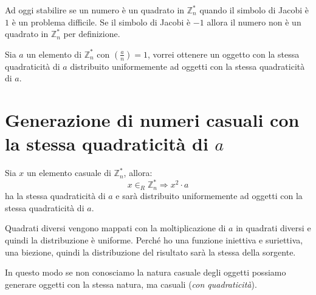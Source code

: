 Ad oggi stabilire se un numero è un quadrato in $\mathbb{Z}_n^*$
quando il simbolo di Jacobi è $1$ è un problema difficile.
Se il simbolo di Jacobi è $-1$ allora il numero non è un quadrato
in $\mathbb{Z}_n^*$ per definizione.

Sia $a$ un elemento di $\mathbb{Z}_n^*$ con $\left(\frac{a}{n} \right) = 1$, 
vorrei ottenere un oggetto con la stessa quadraticità di $a$ 
distribuito uniformemente ad oggetti con la stessa quadraticità di $a$.
\section{Generazione di numeri casuali con la stessa quadraticità di $a$}
Sia $x$ un elemento casuale di $\mathbb{Z}_n^*$, allora:
\[
  x \in_R \mathbb{Z}_n^* \Rightarrow x^2 \cdot a
\]
ha la stessa quadraticità di $a$ e sarà distribuito uniformemente 
ad oggetti con la stessa quadraticità di $a$.

Quadrati diversi vengono mappati con la moltiplicazione di $a$ in quadrati 
diversi e quindi la distribuzione è uniforme.
Perché ho una funzione iniettiva e suriettiva, una biezione, quindi la distribuzione 
del risultato sarà la stessa della sorgente.

In questo modo se non conosciamo la natura casuale degli oggetti possiamo 
generare oggetti con la stessa natura, ma casuali (\textit{con quadraticità}).
